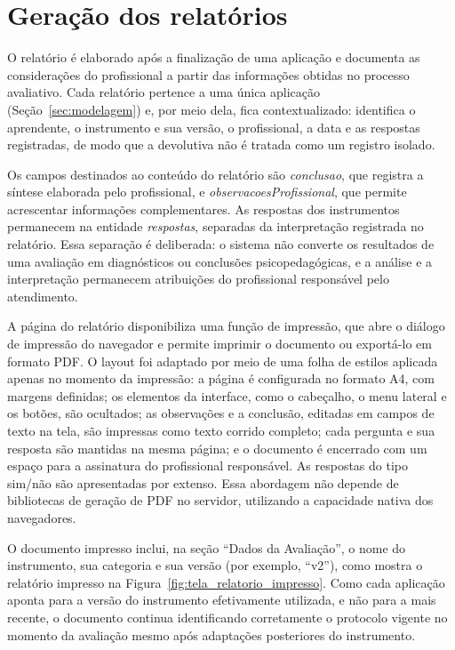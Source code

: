\section{Geração dos relatórios}\label{sec:relatorios}

O relatório é elaborado após a finalização de uma aplicação e documenta as considerações do profissional a partir das informações obtidas no processo avaliativo. Cada relatório pertence a uma única aplicação (Seção~\ref{sec:modelagem}) e, por meio dela, fica contextualizado: identifica o aprendente, o instrumento e sua versão, o profissional, a data e as respostas registradas, de modo que a devolutiva não é tratada como um registro isolado.

Os campos destinados ao conteúdo do relatório são \textit{conclusao}, que registra a síntese elaborada pelo profissional, e \textit{observacoesProfissional}, que permite acrescentar informações complementares. As respostas dos instrumentos permanecem na entidade \textit{respostas}, separadas da interpretação registrada no relatório. Essa separação é deliberada: o sistema não converte os resultados de uma avaliação em diagnósticos ou conclusões psicopedagógicas, e a análise e a interpretação permanecem atribuições do profissional responsável pelo atendimento.

A página do relatório disponibiliza uma função de impressão, que abre o diálogo de impressão do navegador e permite imprimir o documento ou exportá-lo em formato PDF. O layout foi adaptado por meio de uma folha de estilos aplicada apenas no momento da impressão: a página é configurada no formato A4, com margens definidas; os elementos da interface, como o cabeçalho, o menu lateral e os botões, são ocultados; as observações e a conclusão, editadas em campos de texto na tela, são impressas como texto corrido completo; cada pergunta e sua resposta são mantidas na mesma página; e o documento é encerrado com um espaço para a assinatura do profissional responsável. As respostas do tipo sim/não são apresentadas por extenso. Essa abordagem não depende de bibliotecas de geração de PDF no servidor, utilizando a capacidade nativa dos navegadores.

O documento impresso inclui, na seção ``Dados da Avaliação'', o nome do instrumento, sua categoria e sua versão (por exemplo, ``v2''), como mostra o relatório impresso na Figura~\ref{fig:tela_relatorio_impresso}. Como cada aplicação aponta para a versão do instrumento efetivamente utilizada, e não para a mais recente, o documento continua identificando corretamente o protocolo vigente no momento da avaliação mesmo após adaptações posteriores do instrumento.
